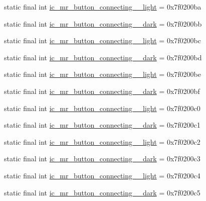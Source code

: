 \begin{CompactItemize}
\item 
static final int \hyperlink{classandroid_1_1support_1_1v7_1_1palette_1_1_r_1_1drawable_53683f3f6e445ff1ea414011b2a862e9}{ic\_\-mr\_\-button\_\-connecting\_\_\-light} = 0x7f0200ba
\item 
static final int \hyperlink{classandroid_1_1support_1_1v7_1_1palette_1_1_r_1_1drawable_49840e5171ca7086606e0d27fc9f1b28}{ic\_\-mr\_\-button\_\-connecting\_\_\-dark} = 0x7f0200bb
\item 
static final int \hyperlink{classandroid_1_1support_1_1v7_1_1palette_1_1_r_1_1drawable_48050410f520ed653145ac45fa06e12f}{ic\_\-mr\_\-button\_\-connecting\_\_\-light} = 0x7f0200bc
\item 
static final int \hyperlink{classandroid_1_1support_1_1v7_1_1palette_1_1_r_1_1drawable_17f9e5864eb7aa7c435f4a488843aedb}{ic\_\-mr\_\-button\_\-connecting\_\_\-dark} = 0x7f0200bd
\item 
static final int \hyperlink{classandroid_1_1support_1_1v7_1_1palette_1_1_r_1_1drawable_a4af33c9dc44222106807dfb58b52915}{ic\_\-mr\_\-button\_\-connecting\_\_\-light} = 0x7f0200be
\item 
static final int \hyperlink{classandroid_1_1support_1_1v7_1_1palette_1_1_r_1_1drawable_79d2dcb6be8f5555af669845d6101cf0}{ic\_\-mr\_\-button\_\-connecting\_\_\-dark} = 0x7f0200bf
\item 
static final int \hyperlink{classandroid_1_1support_1_1v7_1_1palette_1_1_r_1_1drawable_38bde0b8e315e736acba8c1bb7c40691}{ic\_\-mr\_\-button\_\-connecting\_\_\-light} = 0x7f0200c0
\item 
static final int \hyperlink{classandroid_1_1support_1_1v7_1_1palette_1_1_r_1_1drawable_781bbd3df4d70eb9f06b62377758f0e6}{ic\_\-mr\_\-button\_\-connecting\_\_\-dark} = 0x7f0200c1
\item 
static final int \hyperlink{classandroid_1_1support_1_1v7_1_1palette_1_1_r_1_1drawable_c3ab4d8b92c24348ca4f37cda4001ab2}{ic\_\-mr\_\-button\_\-connecting\_\_\-light} = 0x7f0200c2
\item 
static final int \hyperlink{classandroid_1_1support_1_1v7_1_1palette_1_1_r_1_1drawable_840fe90458640318cfe22b17d9f678d3}{ic\_\-mr\_\-button\_\-connecting\_\_\-dark} = 0x7f0200c3
\item 
static final int \hyperlink{classandroid_1_1support_1_1v7_1_1palette_1_1_r_1_1drawable_df8fb12f618ea5f48f5fcae08491a8cd}{ic\_\-mr\_\-button\_\-connecting\_\_\-light} = 0x7f0200c4
\item 
static final int \hyperlink{classandroid_1_1support_1_1v7_1_1palette_1_1_r_1_1drawable_e8c23aa0ff811f60720a3429f3c15603}{ic\_\-mr\_\-button\_\-connecting\_\_\-dark} = 0x7f0200c5

\end{CompactItemize}
